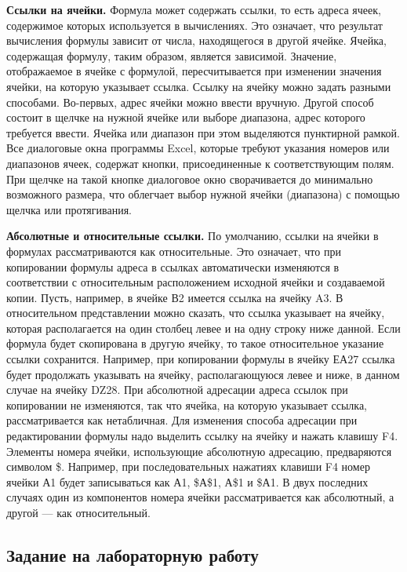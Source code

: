 \textbf{Ссылки на ячейки.} Формула может содержать ссылки, то есть адреса ячеек, содержимое которых используется в вычислениях. Это означает, что результат вычисления формулы зависит от числа, находящегося в другой ячейке. Ячейка, содержащая формулу, таким образом, является зависимой. Значение, отображаемое в ячейке с формулой, пересчитывается при изменении значения ячейки, на которую указывает ссылка. Ссылку на ячейку можно задать разными способами. Во-первых, адрес ячейки можно ввести вручную. Другой способ состоит в щелчке на нужной ячейке или выборе диапазона, адрес которого требуется ввести. Ячейка или диапазон при этом выделяются пунктирной рамкой. Все диалоговые окна программы Excel, которые требуют указания номеров или диапазонов ячеек, содержат кнопки, присоединенные к соответствующим полям. При щелчке на такой кнопке диалоговое окно сворачивается до минимально возможного размера, что облегчает выбор нужной ячейки (диапазона) с помощью щелчка или протягивания.

\textbf{Абсолютные и относительные ссылки.} По умолчанию, ссылки на ячейки в формулах рассматриваются как относительные. Это означает, что при копировании формулы адреса в ссылках автоматически изменяются в соответствии с относительным расположением исходной ячейки и создаваемой копии. Пусть, например, в ячейке В2 имеется ссылка на ячейку A3. В относительном представлении можно сказать, что ссылка указывает на ячейку, которая располагается на один столбец левее и на одну строку ниже данной. Если формула будет скопирована в другую ячейку, то такое относительное указание ссылки сохранится. Например, при копировании формулы в ячейку ЕА27 ссылка будет продолжать указывать на ячейку, располагающуюся левее и ниже, в данном случае на ячейку DZ28. При абсолютной адресации адреса ссылок при копировании не изменяются, так что ячейка, на которую указывает ссылка, рассматривается как нетабличная. Для изменения способа адресации при редактировании формулы надо выделить ссылку на ячейку и нажать клавишу F4. Элементы номера ячейки, использующие абсолютную адресацию, предваряются символом \$. Например, при последовательных нажатиях клавиши F4 номер ячейки А1 будет записываться как А1, \$А\$1, А\$1 и \$А1. В двух последних случаях один из компонентов номера ячейки рассматривается как абсолютный, а другой --- как относительный.

\newpage
\subsection{Задание на лабораторную работу}

